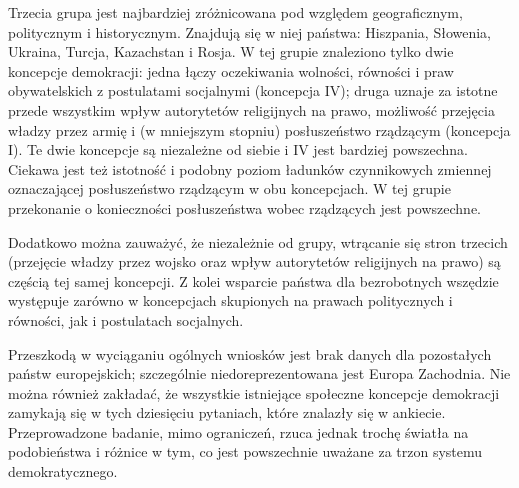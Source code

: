 \documentclass[12pt]{article}
\begin{document}
Trzecia grupa jest najbardziej zróżnicowana pod względem geograficznym, politycznym i historycznym. Znajdują się w niej państwa: Hiszpania, Słowenia, Ukraina, Turcja, Kazachstan i Rosja. W tej grupie znaleziono tylko dwie koncepcje demokracji: jedna łączy oczekiwania wolności, równości i praw obywatelskich z postulatami socjalnymi (koncepcja IV); druga uznaje za istotne przede wszystkim wpływ autorytetów religijnych na prawo, możliwość przejęcia władzy przez armię i (w mniejszym stopniu) posłuszeństwo rządzącym (koncepcja I). Te dwie koncepcje są niezależne od siebie i IV jest bardziej powszechna. Ciekawa jest też istotność i podobny poziom ładunków czynnikowych zmiennej oznaczającej posłuszeństwo rządzącym w obu koncepcjach. W tej grupie przekonanie o konieczności posłuszeństwa wobec rządzących jest powszechne.

Dodatkowo można zauważyć, że niezależnie od grupy, wtrącanie się stron trzecich (przejęcie władzy przez wojsko oraz wpływ autorytetów religijnych na prawo) są częścią tej samej koncepcji. Z kolei wsparcie państwa dla bezrobotnych wszędzie występuje zarówno w koncepcjach skupionych na prawach politycznych i równości, jak i postulatach socjalnych.

Przeszkodą w wyciąganiu ogólnych wniosków jest brak danych dla pozostałych państw europejskich; szczególnie niedoreprezentowana jest Europa Zachodnia. Nie można również zakładać, że wszystkie istniejące społeczne koncepcje demokracji zamykają się w tych dziesięciu pytaniach, które znalazły się w ankiecie. Przeprowadzone badanie, mimo ograniczeń, rzuca jednak trochę światła na podobieństwa i różnice w tym, co jest powszechnie uważane za trzon systemu demokratycznego.



\end{document}
